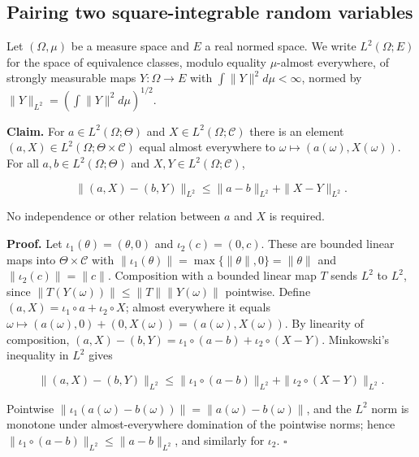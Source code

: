 \documentclass[11pt,a4paper]{report}
\begin{document}
\subsection{\texorpdfstring{Pairing two square-integrable random variables}{Pairing two square-integrable random variables}}


Let \((\Omega,\mu)\) be a measure space and \(E\) a real normed space. We write \(L^2(\Omega;E)\) for the space of equivalence classes, modulo equality \(\mu\)-almost everywhere, of strongly measurable maps \(Y:\Omega\to E\) with \(\int\|Y\|^2d\mu<\infty\), normed by \(\|Y\|_{L^2}=(\int\|Y\|^2d\mu)^{1/2}\).




\textbf{Claim.} For \(a\in L^2(\Omega;\Theta)\) and \(X\in L^2(\Omega;\mathcal C)\) there is an element \((a,X)\in L^2(\Omega;\Theta\times\mathcal C)\) equal almost everywhere to \(\omega\mapsto(a(\omega),X(\omega))\). For all \(a,b\in L^2(\Omega;\Theta)\) and \(X,Y\in L^2(\Omega;\mathcal C)\),


\[\bigl\|(a,X)-(b,Y)\bigr\|_{L^2}\le\|a-b\|_{L^2}+\|X-Y\|_{L^2}.\]


No independence or other relation between \(a\) and \(X\) is required.




\textbf{Proof.} Let \(\iota_1(\theta)=(\theta,0)\) and \(\iota_2(c)=(0,c)\). These are bounded linear maps into \(\Theta\times\mathcal C\) with \(\|\iota_1(\theta)\|=\max\{\|\theta\|,0\}=\|\theta\|\) and \(\|\iota_2(c)\|=\|c\|\). Composition with a bounded linear map \(T\) sends \(L^2\) to \(L^2\), since \(\|T(Y(\omega))\|\le\|T\|\|Y(\omega)\|\) pointwise. Define \((a,X)=\iota_1\circ a+\iota_2\circ X\); almost everywhere it equals \(\omega\mapsto(a(\omega),0)+(0,X(\omega))=(a(\omega),X(\omega))\). By linearity of composition, \((a,X)-(b,Y)=\iota_1\circ(a-b)+\iota_2\circ(X-Y)\). Minkowski's inequality in \(L^2\) gives


\[\bigl\|(a,X)-(b,Y)\bigr\|_{L^2}\le\|\iota_1\circ(a-b)\|_{L^2}+\|\iota_2\circ(X-Y)\|_{L^2}.\]


Pointwise \(\|\iota_1(a(\omega)-b(\omega))\|=\|a(\omega)-b(\omega)\|\), and the \(L^2\) norm is monotone under almost-everywhere domination of the pointwise norms; hence \(\|\iota_1\circ(a-b)\|_{L^2}\le\|a-b\|_{L^2}\), and similarly for \(\iota_2\). \(\square\)
\end{document}
